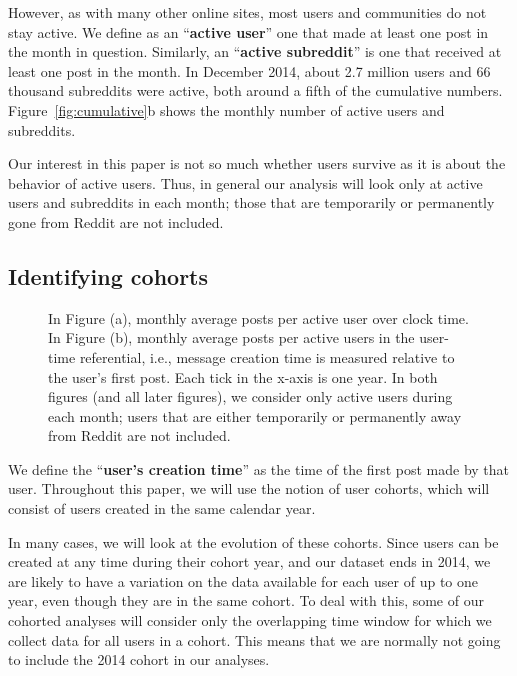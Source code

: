 However, as with many other online sites, most users \cite{Scellato2011,Hughes2009,Java2007} and communities \cite{Arguello2006} do not stay active. We define as an ``\textbf{active user}'' one that made at least one post in the month in question. Similarly, an ``\textbf{active subreddit}'' is one that received at least one post in the month. In December 2014, about 2.7 million users and 66 thousand subreddits were active, both around a fifth of the cumulative numbers. Figure~\ref{fig:cumulative}b shows the monthly number of active users and subreddits.

Our interest in this paper is not so much whether users survive as it is about the behavior of active users.  Thus, 
in general our analysis will look only at active users and subreddits in each month; those that are temporarily or permanently gone from Reddit are not included.  

\subsection{Identifying cohorts}

\begin{figure}[!tb]
\centering
{}
\caption{In Figure (a), monthly average posts per active user over clock time. In Figure (b), monthly average posts per active users in the user-time referential, i.e., message creation time is measured relative to the user's first post.  Each tick in the x-axis is one year.  In both figures (and all later figures), we consider only active users during each month; users that are either temporarily or permanently away from Reddit are not included.}
\label{fig:overall_posts}
\end{figure}

We define the ``\textbf{user's creation time}'' as the time of the first post made by that user.  Throughout this paper, we will use the notion of user cohorts, which will consist of users created in the same calendar year.

In many cases, we will look at the evolution of these cohorts. Since users can be created at any time during their cohort year, and our dataset ends in 2014, 
we are likely to have a variation on the data available for each user of up to one year, even though they are in the same cohort.  To deal with this, some of our cohorted analyses will consider only the overlapping time window for which we collect data for all users in a cohort.   This means that we are normally not going to include the 2014 cohort in our analyses.


